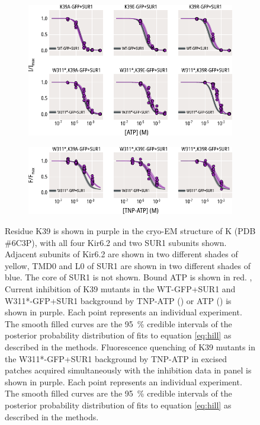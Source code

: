 \begin{figure}[h]
\begin{subfigure}[t]{0.45\textwidth}
		\centering
		\includegraphics[width=\textwidth]{k39_2.pdf}
	\end{subfigure}
	\hfill
	\begin{subfigure}[t]{0.45\textwidth}
		\caption{}\label{ch5fig:k39_tnpatp_popfits_2}
		\centering
		\includegraphics[width=\textwidth]{k39_4.pdf}
	\end{subfigure}
	\caption[Functional effects of K39 mutations]{
	 Residue K39 is shown in purple in the cryo-EM structure of K\ATP{} (PDB \#6C3P), with all four Kir6.2 and two SUR1 subunits shown.
	Adjacent subunits of Kir6.2 are shown in two different shades of yellow, TMD0 and L0 of SUR1 are shown in two different shades of blue.
	The core of SUR1 is not shown.
	Bound ATP is shown in red.
	,  Current inhibition of K39 mutants in the WT-GFP+SUR1 and W311*-GFP+SUR1 background by TNP-ATP () or ATP () is shown in purple.
	Each point represents an individual experiment.
	The smooth filled curves are the \SI{95}{\percent} credible intervals of the posterior probability distribution of fits to equation \ref{eq:hill} as described in the methods.
	 Fluorescence quenching of K39 mutants in the W311*-GFP+SUR1 background by TNP-ATP in excised patches acquired simultaneously with the inhibition data in panel  is shown in purple.
	Each point represents an individual experiment.
	The smooth filled curves are the \SI{95}{\percent} credible intervals of the posterior probability distribution of fits to equation \ref{eq:hill} as described in the methods.
	}\label{ch5fig:k39_1}
\end{figure}

